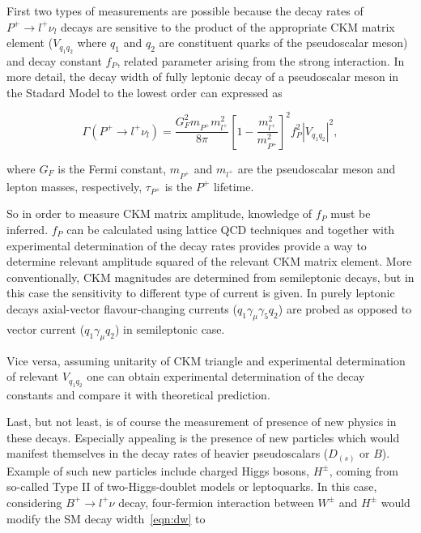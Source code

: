 First two types of measurements are possible because the decay rates of $P^{+}\rightarrow l^{+} \nu_{l}$ decays are sensitive to the product of the appropriate CKM matrix element ($V_{q_{1}q_{2}}$ where $q_{1}$ and $q_{2}$ are constituent quarks of the pseudoscalar meson) and decay constant $f_{P}$, related parameter arising from the strong interaction. In more detail, the decay width of fully leptonic decay of a pseudoscalar meson in the Stadard Model to the lowest order can expressed as 

\begin{equation}
\Gamma(P^{+} \rightarrow {l^{+}} \nu_{l})=  
	\frac{G_{F}^{2} m^{}_{P^{+}}  m_{l^{+}}^{2}}{8\pi} 
	\left[1 - \frac{m_{l^{+}}^{2}}{m_{P^{+}}^{2}}\right]^{2}  
	f_{P}^{2} |V_{q_{1}q_{2}}|^{2} 
	,
\label{eqn:dw} 
\end{equation}

where
$G_F$ is the Fermi constant,
$m^{}_{P^{+}}$ and $m_{l^{+}}$ are the pseudoscalar meson and lepton masses, respectively,
$\tau_{P^{+}}$ is the $P^{+}$ lifetime.

So in order to measure CKM matrix amplitude, knowledge of $f_{P}$ must be inferred. $f_{P}$ can be calculated using lattice QCD techniques and together with experimental determination of the decay rates provides provide a way to determine relevant amplitude squared of the relevant CKM matrix element. More conventionally, CKM magnitudes are determined from semileptonic decays, but in this case the sensitivity to different type of current is given. In purely leptonic decays axial-vector flavour-changing currents ($q_{1}\gamma_{\mu}\gamma_{5}q_{2}$) are probed as opposed to vector current ($q_{1}\gamma_{\mu}q_{2}$) in semileptonic case.

Vice versa, assuming unitarity of CKM triangle and experimental determination of relevant $V_{q_{1}q_{2}}$ one can obtain experimental determination of the decay constants and compare it with theoretical prediction.

Last, but not least, is of course the measurement of presence of new physics in these decays. Especially appealing is the presence of new particles which would manifest themselves in the decay rates of heavier pseudoscalars ($D_{(s)}$ or $B$). Example of such new particles include charged Higgs bosons, $H^{\pm}$, coming from so-called Type II of two-Higgs-doublet models \cite{Hou:1992sy}\cite{Akeroyd:2003zr}\cite{Dobrescu:2008er} or leptoquarks\cite{Dobrescu:2008er}. In this case, considering $B^{+}\rightarrow l^{+}\nu$ decay, four-fermion interaction between $W^{\pm}$ and $H^{\pm}$ would modify the SM decay width~\autoref{eqn:dw} to

